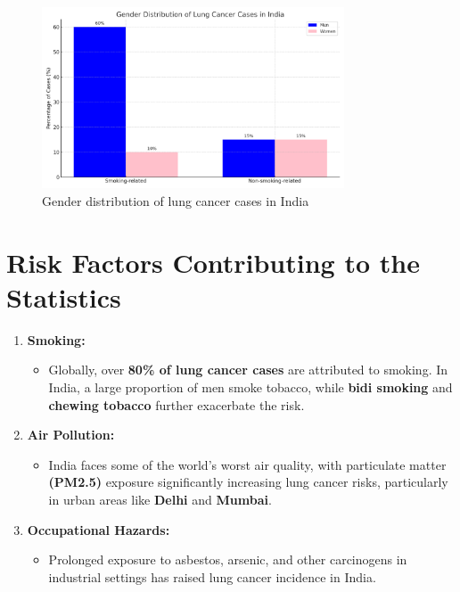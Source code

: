 \begin{figure}[h!]
    \centering
    \includegraphics[width=0.8\textwidth]{images/lung_cancer_gender_distribution_chart.png}
    \caption{Gender distribution of lung cancer cases in India}
    \label{fig:gender_distribution}
\end{figure}

\section{Risk Factors Contributing to the Statistics}
\begin{highlight}
\begin{enumerate}
    \item \textbf{Smoking:}
    \begin{itemize}
        \item Globally, over \textbf{80\% of lung cancer cases} are attributed to smoking. In India, a large proportion of men smoke tobacco, while \textbf{bidi smoking} and \textbf{chewing tobacco} further exacerbate the risk.
    \end{itemize}
    \item \textbf{Air Pollution:}
    \begin{itemize}
        \item India faces some of the world's worst air quality, with particulate matter \textbf{(PM2.5)} exposure significantly increasing lung cancer risks, particularly in urban areas like \textbf{Delhi} and\textbf{ Mumbai}.
    \end{itemize}
    \item \textbf{Occupational Hazards:}
    \begin{itemize}
        \item Prolonged exposure to asbestos, arsenic, and other carcinogens in industrial settings has raised lung cancer incidence in India.
    \end{itemize}
\end{enumerate}
\end{highlight}

